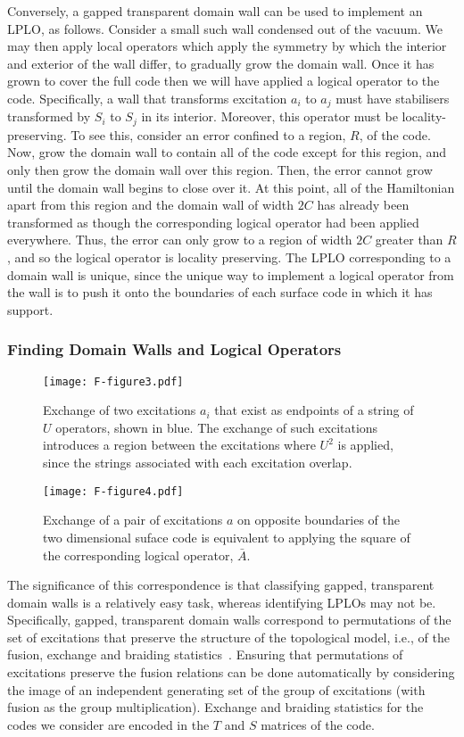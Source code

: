 \documentclass[pra,twocolumn,a4paper,nofootinbib]{revtex4-1}
\begin{document}
Conversely, a gapped transparent domain wall can be used to implement an LPLO, as follows. Consider a small such wall condensed out of the vacuum. We may then apply local operators which apply the symmetry by which the interior and exterior of the wall differ, to gradually grow the domain wall. Once it has grown to cover the full code then we will have applied a logical operator to the code. Specifically, a wall that transforms excitation $a_i$ to $a_j$ must have stabilisers transformed by $S_i$ to $S_j$ in its interior. Moreover, this operator must be locality-preserving. To see this, consider an error confined to a region, $R$, of the code. Now, grow the domain wall to contain all of the code except for this region, and only then grow the domain wall over this region. Then, the error cannot grow until the domain wall begins to close over it. At this point, all of the Hamiltonian apart from this region and the domain wall of width $2C$ has already been transformed as though the corresponding logical operator had been applied everywhere. Thus, the error can only grow to a region of width $2C$ greater than $R$, and so the logical operator is locality preserving. The LPLO corresponding to a domain wall is unique, since the unique way to implement a logical operator from the wall is to push it onto the boundaries of each surface code in which it has support.

\subsubsection{Finding Domain Walls and Logical Operators}
\label{BrEx}
\begin{figure}
\centering
\texttt{[image: F-figure3.pdf]}
\caption{Exchange of two excitations $a_i$ that exist as endpoints of a string of $U$ operators, shown in blue. The exchange of such excitations introduces a region between the excitations where $U^2$ is applied, since the strings associated with each excitation overlap. \label{fig:Exc1}}
\end{figure}

\begin{figure}
\centering
\texttt{[image: F-figure4.pdf]}
\caption{Exchange of a pair of excitations $a$ on opposite boundaries of the two dimensional suface code is equivalent to applying the square of the corresponding logical operator, $\bar{A}$. \label{fig:Exc2}}
\end{figure}

The significance of this correspondence is that classifying gapped, transparent domain walls is a relatively easy task, whereas identifying LPLOs may not be. Specifically, gapped, transparent domain walls correspond to permutations of the set of excitations that preserve the structure of the topological model, i.e., of the fusion, exchange and braiding statistics~\cite{KitaevKong,Lanetal}. Ensuring that permutations of excitations preserve the fusion relations can be done automatically by considering the image of an independent generating set of the group of excitations (with fusion as the group multiplication). Exchange and braiding statistics for the codes we consider are encoded in the $T$ and $S$ matrices of the code.
\end{document}
